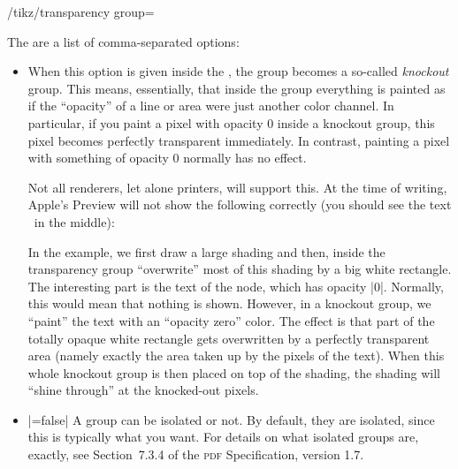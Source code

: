 \begin{key}{/tikz/transparency group=}
\begin{codeexample}[]
\end{codeexample}

  The  are a list of comma-separated options:
  \begin{itemize}
  \item {} When this option is given inside the
    , the group becomes a so-called \emph{knockout}
    group. This means, essentially, that inside the group everything
    is painted as if the ``opacity'' of a line or area were just
    another color channel. In particular, if you paint a pixel with
    opacity $0$ inside a knockout group, this pixel becomes perfectly
    transparent immediately. In contrast, painting a pixel with
    something of opacity 0 normally has no effect.

    Not all renderers, let alone printers, will support
    this. At the time of writing, Apple's Preview will not show the
    following correctly (you should see the text \tikzname\ in the
    middle): 
\begin{codeexample}[]
\end{codeexample}
   In the example, we first draw a large shading and then, inside the
   transparency group ``overwrite'' most of this shading by a big
   white rectangle. The interesting part is the text of the node,
   which has opacity |0|. Normally, this would mean that nothing is
   shown. However, in a knockout group, we ``paint'' the text with an
   ``opacity zero'' color. The effect is that part of the totally
   opaque white rectangle gets overwritten by a perfectly transparent
   area (namely exactly the area taken up by the pixels of the
   text). When this whole knockout group is then placed on top of the
   shading, the shading will ``shine through'' at the knocked-out
   pixels.

  \item {}|=false| A group can be isolated or
    not. By default, they are isolated, since this is typically what you
    want. For details on what isolated groups are, exactly, see
    Section~7.3.4 of the \textsc{pdf} Specification, version 1.7.
  \end{itemize}


\end{key}
